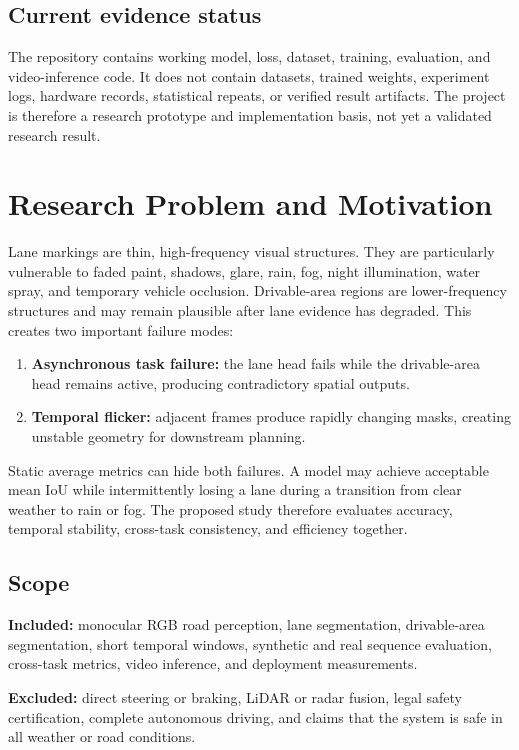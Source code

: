 \documentclass[11pt,a4paper]{article}
\begin{document}
\subsection{Current evidence status}
The repository contains working model, loss, dataset, training, evaluation, and video-inference code. It does not contain datasets, trained weights, experiment logs, hardware records, statistical repeats, or verified result artifacts. The project is therefore a research prototype and implementation basis, not yet a validated research result.

\section{Research Problem and Motivation}

Lane markings are thin, high-frequency visual structures. They are particularly vulnerable to faded paint, shadows, glare, rain, fog, night illumination, water spray, and temporary vehicle occlusion. Drivable-area regions are lower-frequency structures and may remain plausible after lane evidence has degraded. This creates two important failure modes:

\begin{enumerate}
\item \textbf{Asynchronous task failure:} the lane head fails while the drivable-area head remains active, producing contradictory spatial outputs.
\item \textbf{Temporal flicker:} adjacent frames produce rapidly changing masks, creating unstable geometry for downstream planning.
\end{enumerate}

Static average metrics can hide both failures. A model may achieve acceptable mean IoU while intermittently losing a lane during a transition from clear weather to rain or fog. The proposed study therefore evaluates accuracy, temporal stability, cross-task consistency, and efficiency together.

\subsection{Scope}
\textbf{Included:} monocular RGB road perception, lane segmentation, drivable-area segmentation, short temporal windows, synthetic and real sequence evaluation, cross-task metrics, video inference, and deployment measurements.

\textbf{Excluded:} direct steering or braking, LiDAR or radar fusion, legal safety certification, complete autonomous driving, and claims that the system is safe in all weather or road conditions.
\end{document}
